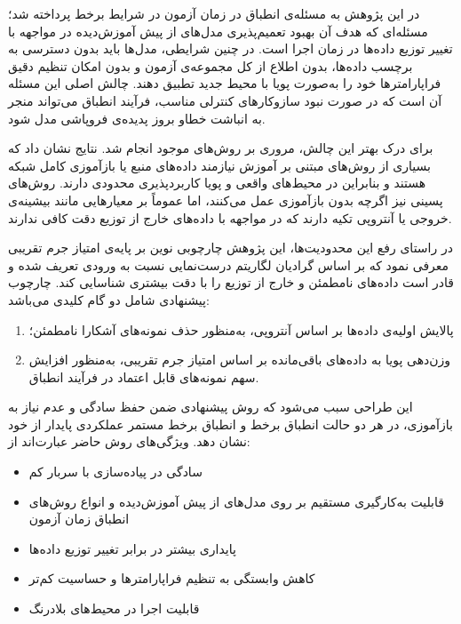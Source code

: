 

در این پژوهش به مسئله‌ی انطباق در زمان آزمون در شرایط برخط پرداخته شد؛ مسئله‌ای که هدف آن بهبود تعمیم‌پذیری مدل‌های از پیش آموزش‌دیده در مواجهه با تغییر توزیع داده‌ها در زمان اجرا است. در چنین شرایطی، مدل‌ها باید بدون دسترسی به برچسب داده‌ها، بدون اطلاع از کل مجموعه‌ی آزمون و بدون امکان تنظیم دقیق فراپارامترها خود را به‌صورت پویا با محیط جدید تطبیق دهند. چالش اصلی این مسئله آن است که در صورت نبود سازوکارهای کنترلی مناسب، فرآیند انطباق می‌تواند منجر به انباشت خطاو بروز پدیده‌ی فروپاشی مدل شود.  

برای درک بهتر این چالش، مروری بر روش‌های موجود انجام شد. نتایج نشان داد که بسیاری از روش‌های مبتنی بر آموزش نیازمند داده‌های منبع یا بازآموزی کامل شبکه هستند و بنابراین در محیط‌های واقعی و پویا کاربردپذیری محدودی دارند. روش‌های پسینی نیز اگرچه بدون بازآموزی عمل می‌کنند، اما عموماً بر معیارهایی مانند بیشینه‌ی خروجی یا آنتروپی تکیه دارند که در مواجهه با داده‌های خارج از توزیع دقت کافی ندارند.  

در راستای رفع این محدودیت‌ها، این پژوهش چارچوبی نوین بر پایه‌ی امتیاز جرم تقریبی معرفی نمود که بر اساس گرادیان لگاریتم درست‌نمایی نسبت به ورودی تعریف شده و قادر است داده‌های نامطمئن و خارج از توزیع را با دقت بیشتری شناسایی کند. چارچوب پیشنهادی شامل دو گام کلیدی می‌باشد:  
\begin{enumerate}
	\item پالایش اولیه‌ی داده‌ها بر اساس آنتروپی، به‌منظور حذف نمونه‌های آشکارا نامطمئن؛
	\item وزن‌دهی پویا به داده‌های باقی‌مانده بر اساس امتیاز جرم تقریبی، به‌منظور افزایش سهم نمونه‌های قابل اعتماد در فرآیند انطباق.
\end{enumerate}

این طراحی سبب می‌شود که روش پیشنهادی ضمن حفظ سادگی و عدم نیاز به بازآموزی، در هر دو حالت انطباق برخط و انطباق برخط مستمر عملکردی پایدار از خود نشان دهد. ویژگی‌های روش حاضر عبارت‌اند از:
\begin{itemize}
	\item سادگی در پیاده‌سازی با سربار کم
	\item قابلیت به‌کارگیری مستقیم بر روی مدل‌های از پیش آموزش‌دیده و انواع روش‌های انطباق زمان آزمون
	\item پایداری بیشتر در برابر تغییر توزیع داده‌ها
	\item کاهش وابستگی به تنظیم فراپارامترها و حساسیت کم‌تر
	\item قابلیت اجرا در محیط‌های بلادرنگ
\end{itemize}

